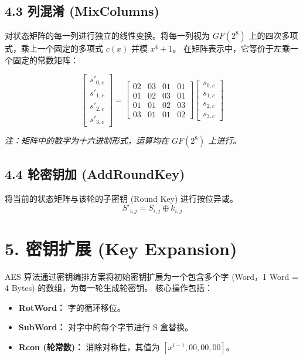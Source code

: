 \documentclass[12pt, a4paper]{article}
\begin{document}
\subsection{4.3 列混淆 (MixColumns)}
对状态矩阵的每一列进行独立的线性变换。将每一列视为 $GF(2^8)$ 上的四次多项式，乘上一个固定的多项式 $c(x)$ 并模 $x^4 + 1$。
在矩阵表示中，它等价于左乘一个固定的常数矩阵：
\begin{tcolorbox}[mathbox]
$$
\begin{bmatrix}
s'_{0,c} \\ s'_{1,c} \\ s'_{2,c} \\ s'_{3,c}
\end{bmatrix}
=
\begin{bmatrix}
02 & 03 & 01 & 01 \\
01 & 02 & 03 & 01 \\
01 & 01 & 02 & 03 \\
03 & 01 & 01 & 02
\end{bmatrix}
\begin{bmatrix}
s_{0,c} \\ s_{1,c} \\ s_{2,c} \\ s_{3,c}
\end{bmatrix}
$$
\end{tcolorbox}
\textit{注：矩阵中的数字为十六进制形式，运算均在 $GF(2^8)$ 上进行。}

\subsection{4.4 轮密钥加 (AddRoundKey)}
将当前的状态矩阵与该轮的子密钥 (Round Key) 进行按位异或。
$$ S'_{i,j} = S_{i,j} \oplus k_{i,j} $$

\section{\color{aesblue}5. 密钥扩展 (Key Expansion)}

AES 算法通过密钥编排方案将初始密钥扩展为一个包含多个字 (Word，1 Word = 4 Bytes) 的数组，为每一轮生成轮密钥。
核心操作包括：
\begin{itemize}
    \item \textbf{RotWord：} 字的循环移位。
    \item \textbf{SubWord：} 对字中的每个字节进行 S 盒替换。
    \item \textbf{Rcon (轮常数)：} 消除对称性，其值为 $[x^{i-1}, 00, 00, 00]$。
\end{itemize}
\end{document}
